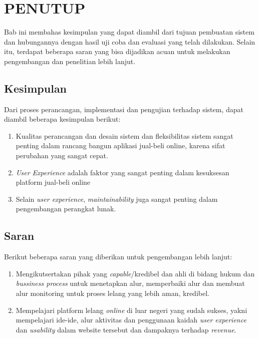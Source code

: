 \chapter{PENUTUP}
  Bab ini membahas kesimpulan yang dapat diambil dari tujuan pembuatan sistem dan hubungannya dengan hasil uji coba dan evaluasi yang telah dilakukan. Selain itu, terdapat beberapa saran yang bisa dijadikan acuan untuk melakukan pengembangan dan penelitian lebih lanjut.
  \section{Kesimpulan}
  Dari proses perancangan, implementasi dan pengujian terhadap sistem, dapat diambil beberapa kesimpulan berikut:
  \begin{enumerate}
    \item Kualitas perancangan dan desain sistem dan fleksibilitas sistem sangat penting dalam rancang bangun aplikasi jual-beli online, karena sifat perubahan yang sangat cepat.
    \item \textit{User Experience} adalah faktor yang sangat penting dalam kesuksesan platform jual-beli online
    \item Selain \textit{user experience}, \textit{maintainability} juga sangat penting dalam pengembangan perangkat lunak.
  \end{enumerate}
  
  \section{Saran}
  Berikut beberapa saran yang diberikan untuk pengembangan lebih lanjut:
  \begin{enumerate}
    \item Mengikutsertakan pihak yang \textit{capable}/kredibel dan ahli di bidang hukum dan \textit{bussiness process} untuk menetapkan alur, memperbaiki alur dan membuat alur monitoring untuk proses lelang yang lebih aman, kredibel.
    \item Mempelajari platform lelang \textit{online} di luar negeri yang sudah sukses, yakni mempelajari ide-ide, alur aktivitas dan penggunaan kaidah \textit{user experience} dan \textit{usability} dalam website tersebut dan dampaknya terhadap \textit{revenue}.
  \end{enumerate}
  
